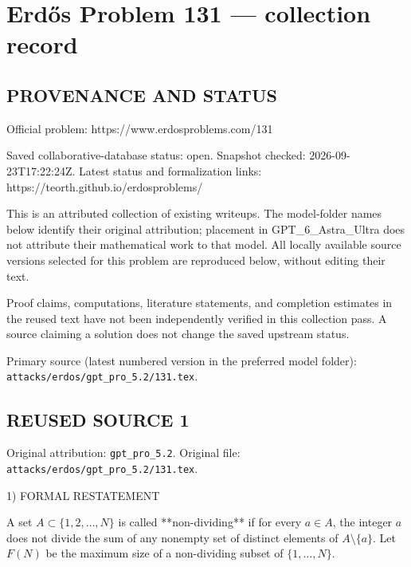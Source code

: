 \section*{Erd\H{o}s Problem 131 --- collection record}

\subsection*{PROVENANCE AND STATUS}
Official problem: https://www.erdosproblems.com/131

Saved collaborative-database status: open.
Snapshot checked: 2026-09-23T17:22:24Z.
Latest status and formalization links: https://teorth.github.io/erdosproblems/

This is an attributed collection of existing writeups. The model-folder names below identify their original attribution; placement in GPT\_6\_Astra\_Ultra does not attribute their mathematical work to that model. All locally available source versions selected for this problem are reproduced below, without editing their text.

Proof claims, computations, literature statements, and completion estimates in the reused text have not been independently verified in this collection pass. A source claiming a solution does not change the saved upstream status.

Primary source (latest numbered version in the preferred model folder): \texttt{attacks/erdos/gpt\_pro\_5.2/131.tex}.

\subsection*{REUSED SOURCE 1}
Original attribution: \texttt{gpt\_pro\_5.2}.
Original file: \texttt{attacks/erdos/gpt\_pro\_5.2/131.tex}.


1) FORMAL RESTATEMENT

A set $A\subset\{1,2,\dots,N\}$ is called **non-dividing** if for every $a\in A$, the integer $a$ does not divide the sum of any nonempty set of distinct elements of $A\setminus\{a\}$.
Let $F(N)$ be the maximum size of a non-dividing subset of $\{1,\dots,N\}$.

